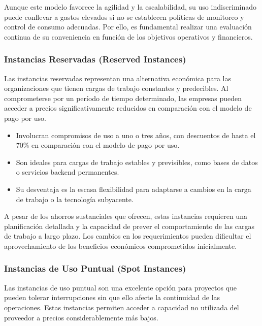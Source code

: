 {                Aunque este modelo favorece la agilidad y la escalabilidad, su uso indiscriminado puede conllevar a gastos elevados si no se establecen políticas de monitoreo y control de consumo adecuadas. Por ello, es fundamental realizar una evaluación continua de su conveniencia en función de los objetivos operativos y financieros.
                
            \subsubsection{Instancias Reservadas (Reserved Instances)}
                Las instancias reservadas representan una alternativa económica para las organizaciones que tienen cargas de trabajo constantes y predecibles. Al comprometerse por un período de tiempo determinado, las empresas pueden acceder a precios significativamente reducidos en comparación con el modelo de pago por uso.
                
                \begin{itemize}
                    \item Involucran compromisos de uso a uno o tres años, con descuentos de hasta el 70\% en comparación con el modelo de pago por uso.
                    \item Son ideales para cargas de trabajo estables y previsibles, como bases de datos o servicios backend permanentes.
                    \item Su desventaja es la escasa flexibilidad para adaptarse a cambios en la carga de trabajo o la tecnología subyacente.
                \end{itemize}

                A pesar de los ahorros sustanciales que ofrecen, estas instancias requieren una planificación detallada y la capacidad de prever el comportamiento de las cargas de trabajo a largo plazo. Los cambios en los requerimientos pueden dificultar el aprovechamiento de los beneficios económicos comprometidos inicialmente.
            
            \subsubsection{Instancias de Uso Puntual (Spot Instances)}
                Las instancias de uso puntual son una excelente opción para proyectos que pueden tolerar interrupciones sin que ello afecte la continuidad de las operaciones. Estas instancias permiten acceder a capacidad no utilizada del proveedor a precios considerablemente más bajos.
                
}

